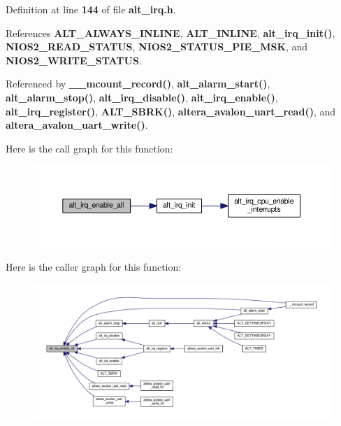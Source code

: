 Definition at line {\bf 144} of file {\bf alt\+\_\+irq.\+h}.



References {\bf A\+L\+T\+\_\+\+A\+L\+W\+A\+Y\+S\+\_\+\+I\+N\+L\+I\+NE}, {\bf A\+L\+T\+\_\+\+I\+N\+L\+I\+NE}, {\bf alt\+\_\+irq\+\_\+init()}, {\bf N\+I\+O\+S2\+\_\+\+R\+E\+A\+D\+\_\+\+S\+T\+A\+T\+US}, {\bf N\+I\+O\+S2\+\_\+\+S\+T\+A\+T\+U\+S\+\_\+\+P\+I\+E\+\_\+\+M\+SK}, and {\bf N\+I\+O\+S2\+\_\+\+W\+R\+I\+T\+E\+\_\+\+S\+T\+A\+T\+US}.



Referenced by {\bf \+\_\+\+\_\+mcount\+\_\+record()}, {\bf alt\+\_\+alarm\+\_\+start()}, {\bf alt\+\_\+alarm\+\_\+stop()}, {\bf alt\+\_\+irq\+\_\+disable()}, {\bf alt\+\_\+irq\+\_\+enable()}, {\bf alt\+\_\+irq\+\_\+register()}, {\bf A\+L\+T\+\_\+\+S\+B\+R\+K()}, {\bf altera\+\_\+avalon\+\_\+uart\+\_\+read()}, and {\bf altera\+\_\+avalon\+\_\+uart\+\_\+write()}.



Here is the call graph for this function\+:
\nopagebreak
\begin{figure}[H]
\begin{center}
\leavevmode
\includegraphics[width=350pt]{dc/dc9/alt__irq_8h_afd307e708b8dcd0cb6674e1d190d3dfe_cgraph}
\end{center}
\end{figure}




Here is the caller graph for this function\+:
\nopagebreak
\begin{figure}[H]
\begin{center}
\leavevmode
\includegraphics[width=350pt]{dc/dc9/alt__irq_8h_afd307e708b8dcd0cb6674e1d190d3dfe_icgraph}
\end{center}
\end{figure}


